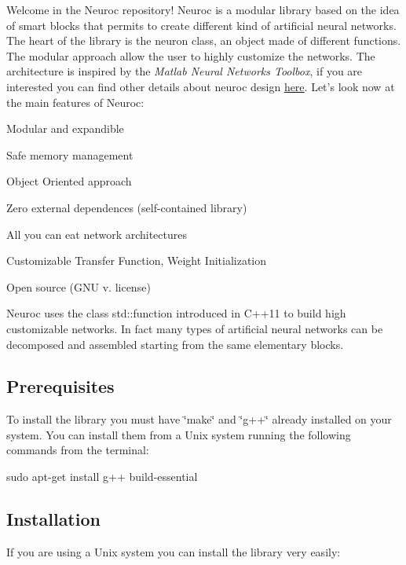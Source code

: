 Welcome in the Neuroc repository! Neuroc is a modular library based on the idea of smart blocks that permits to create different kind of artificial neural networks. The heart of the library is the neuron class, an object made of different functions. The modular approach allow the user to highly customize the networks. The architecture is inspired by the {\itshape Matlab Neural Networks Toolbox}, if you are interested you can find other details about neuroc design \hyperlink{md__a_r_c_h_i_t_e_c_t_u_r_e}{here}. Let's look now at the main features of Neuroc\-:


\begin{DoxyItemize}
\item Modular and expandible
\item Safe memory management
\item Object Oriented approach
\item Zero external dependences (self-\/contained library)
\item All you can eat network architectures
\item Customizable Transfer Function, Weight Initialization
\item Open source (G\-N\-U v. license)
\end{DoxyItemize}

Neuroc uses the class std\-::function introduced in C++11 to build high customizable networks. In fact many types of artificial neural networks can be decomposed and assembled starting from the same elementary blocks.

\subsection*{Prerequisites }

To install the library you must have \char`\"{}make\char`\"{} and \char`\"{}g++\char`\"{} already installed on your system. You can install them from a Unix system running the following commands from the terminal\-:

{\ttfamily sudo apt-\/get install g++ build-\/essential}

\subsection*{Installation }

If you are using a Unix system you can install the library very easily\-:


